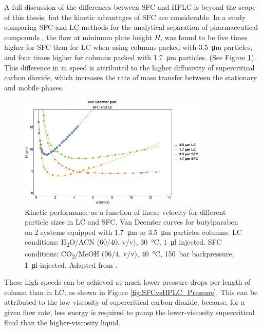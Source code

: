 A full discussion of the differences between SFC and HPLC is beyond the scope of
this thesis, but the kinetic advantages of SFC are considerable. In a study
comparing SFC and LC methods for the analytical separation of pharmaceutical
compounds \autocite{Perrenoud2012}, the flow at minimum plate height \(H\), was
found to be five times higher for SFC than for LC when using columns packed with
\SI{3.5}{\micro\metre} particles, and four times higher for columns packed with
\SI{1.7}{\micro\metre} particles. (See Figure \ref{fig:SFCvsHPLC_Van_Deemter}).
This difference in in speed is attributed to the higher diffusivity of
supercritical carbon dioxide, which increases the rate of mass transfer between
the stationary and mobile phases.

\begin{figure}[hptb] \centering
\includegraphics[width=0.8\textwidth]{Figures/SFCvsHPLC_Van_Deemter} \decoRule
\caption[Van Deemter]{Kinetic performance as a function of linear velocity for
different particle sizes in LC and SFC. Van Deemter curves for butylparaben on 2
systems equipped with \SI{1.7}{\micro\metre} or \SI{3.5}{\micro\metre} particles
columns. LC conditions: H\textsubscript{2}O/ACN (60/40, v/v), \SI{30}{\celsius},
\SI{1}{\micro\litre} injected. SFC conditions: CO\textsubscript{2}/MeOH (96/4,
v/v), \SI{40}{\celsius}, \SI{150}{\bar} backpressure, \SI{1}{\micro\litre}
injected. Adapted from \autocite{Perrenoud2012}.}
\label{fig:SFCvsHPLC_Van_Deemter}

\end{figure}

These high speeds can be achieved at much lower pressure drops per length of
column than in LC, as shown in Figure \ref{fig:SFCvsHPLC_Pressure}. This can be
attributed to the low viscosity of supercritical carbon dioxide, because, for a
given flow rate, less energy is required to pump the lower-viscosity
supercritical fluid than the higher-viscosity liquid.

